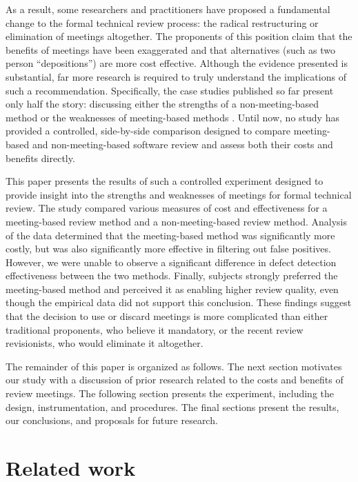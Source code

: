 As a result, some researchers and practitioners have proposed a fundamental
change to the formal technical review process: the radical restructuring or
elimination of meetings altogether.  The proponents of this position claim
that the benefits of meetings have been exaggerated and that alternatives
(such as two person ``depositions'') are more cost effective.  Although the
evidence presented is substantial, far more research is required to truly
understand the implications of such a recommendation. Specifically, the
case studies published so far present only half the story: discussing
either the strengths of a non-meeting-based method \cite{Parnas87} or the
weaknesses of meeting-based methods \cite{Votta93}. Until now, no study has
provided a controlled, side-by-side comparison designed to compare meeting-based and
non-meeting-based software review and assess both their costs and
benefits directly.

This paper presents the results of such a controlled experiment designed
to provide insight into the strengths and weaknesses of meetings for
formal technical review. The study compared various measures of cost and
effectiveness for a meeting-based review method and a non-meeting-based
review method.  Analysis of the data determined that the meeting-based
method was significantly more costly, but was also significantly more effective
in filtering out false positives.  However, we were unable to observe a
significant difference in defect detection effectiveness between the two
methods.  Finally, subjects strongly preferred the meeting-based method
and perceived it as enabling higher review quality, even though the empirical
data did not support this conclusion.  These findings suggest that 
the decision to use or discard meetings is more complicated than either 
traditional proponents, who believe it mandatory, or the 
recent review revisionists, who would eliminate it altogether.

The remainder of this paper is organized as follows.  The next section
motivates our study with a discussion of prior research related to the
costs and benefits of review meetings. The following section presents the
experiment, including the design, instrumentation, and procedures. The
final sections present the results, our conclusions, and proposals for
future research.

\section{Related work} 

